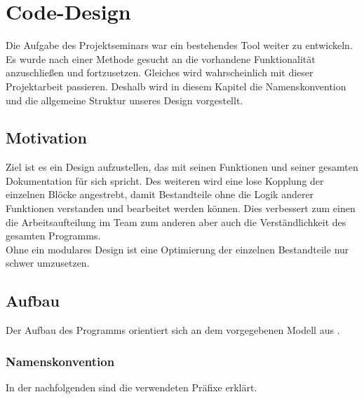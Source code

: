 \documentclass[../Report.tex]{subfiles}
\begin{document}
\chapter{Code-Design}
\label{chap:code}
Die Aufgabe des Projektseminars war ein bestehendes Tool weiter zu entwickeln. Es wurde nach einer Methode gesucht an die vorhandene Funktionalität anzuschließen und fortzusetzen. Gleiches wird wahrscheinlich mit dieser Projektarbeit passieren. Deshalb wird in diesem Kapitel die Namenskonvention und die allgemeine Struktur unseres Design vorgestellt.

\section{Motivation}
\label{sec:code.motivation}
Ziel ist es ein Design aufzustellen, das mit seinen Funktionen und seiner gesamten Dokumentation für sich spricht. Des weiteren wird eine lose Kopplung der einzelnen Blöcke angestrebt, damit Bestandteile ohne die Logik anderer Funktionen verstanden und bearbeitet werden können. Dies verbessert zum einen die Arbeitsaufteilung im Team zum anderen aber auch die Verständlichkeit des gesamten Programms. \\
Ohne ein modulares Design ist eine Optimierung der einzelnen Bestandteile nur schwer umzusetzen.

\section{Aufbau}
\label{sec:code.aufbau}
Der Aufbau des Programms orientiert sich an dem vorgegebenen Modell aus .

\subsection{Namenskonvention}
\label{subsec:code.namen}
In der nachfolgenden  sind die verwendeten Präfixe erklärt.
	
\end{document}
